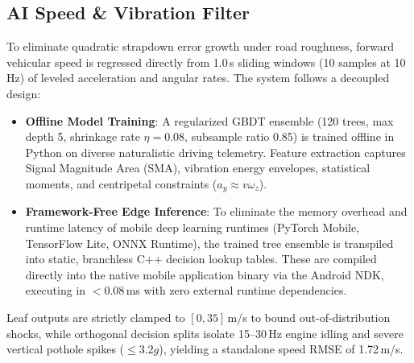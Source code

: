 \documentclass[conference]{IEEEtran}
\begin{document}
\subsection{AI Speed \& Vibration Filter}
To eliminate quadratic strapdown error growth under road roughness, forward vehicular speed is regressed directly from 1.0\,s sliding windows (10 samples at 10\,Hz) of leveled acceleration and angular rates. The system follows a decoupled design:
\begin{itemize}
\item \textbf{Offline Model Training}: A regularized GBDT ensemble \cite{friedman2001} (120 trees, max depth 5, shrinkage rate $\eta=0.08$, subsample ratio 0.85) is trained offline in Python on diverse naturalistic driving telemetry. Feature extraction captures Signal Magnitude Area (SMA), vibration energy envelopes, statistical moments, and centripetal constraints ($a_y \approx v\omega_z$).
\item \textbf{Framework-Free Edge Inference}: To eliminate the memory overhead and runtime latency of mobile deep learning runtimes (PyTorch Mobile, TensorFlow Lite, ONNX Runtime), the trained tree ensemble is transpiled into static, branchless C++ decision lookup tables. These are compiled directly into the native mobile application binary via the Android NDK, executing in $<0.08$\,ms with zero external runtime dependencies.
\end{itemize}
Leaf outputs are strictly clamped to $[0, 35]$\,m/s to bound out-of-distribution shocks, while orthogonal decision splits isolate 15--30\,Hz engine idling and severe vertical pothole spikes ($\le 3.2g$), yielding a standalone speed RMSE of 1.72\,m/s.
\end{document}
